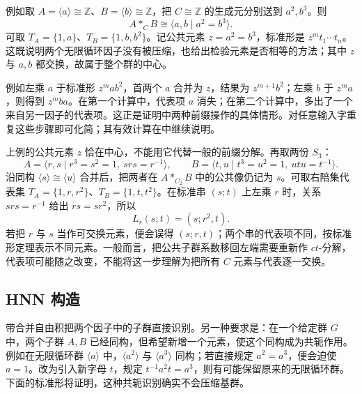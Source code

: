 例如取 \(A=\langle a\rangle\cong\mathbb Z\)、\(B=\langle b\rangle\cong\mathbb Z\)，把 \(C\cong\mathbb Z\) 的生成元分别送到 \(a^2,b^3\)。则
\[
	A*_C B\cong\langle a,b\mid a^2=b^3\rangle.
\]
可取 \(T_A=\{1,a\}\)、\(T_B=\{1,b,b^2\}\)。记公共元素 \(z=a^2=b^3\)，标准形是 \(z^m t_1\cdots t_n\)。这既说明两个无限循环因子没有被压缩，也给出检验元素是否相等的方法；其中 \(z\) 与 \(a,b\) 都交换，故属于整个群的中心。

\ProseParagraphBreak
例如左乘 \(a\) 于标准形 \(z^mab^2\)，首两个 \(a\) 合并为 \(z\)，结果为 \(z^{m+1}b^2\)；左乘 \(b\) 于 \(z^ma\)，则得到 \(z^mba\)。在第一个计算中，代表项 \(a\) 消失；在第二个计算中，多出了一个来自另一因子的代表项。这正是证明中两种前缀操作的具体情形。对任意输入字重复这些步骤即可化简；其有效计算在中继续说明。

\ProseParagraphBreak
上例的公共元素 \(z\) 恰在中心，不能用它代替一般的前缀分解。再取两份 \(S_3\)：
\[
	A=\langle r,s\mid r^3=s^2=1,\ srs=r^{-1}\rangle, \qquad B=\langle t,u\mid t^3=u^2=1,\ utu=t^{-1}\rangle.
\]
沿同构 \(\langle s\rangle\cong\langle u\rangle\) 合并后，把两者在 \(A*_{C_2}B\) 中的公共像仍记为 \(s\)。可取右陪集代表集 \(T_A=\{1,r,r^2\}\)、\(T_B=\{1,t,t^2\}\)。在标准串 \((s;t)\) 上左乘 \(r\) 时，关系 \(srs=r^{-1}\) 给出 \(rs=sr^2\)，所以
\[
	L_r(s;t)=(s;r^2,t).
\]
若把 \(r\) 与 \(s\) 当作可交换元素，便会误得 \((s;r,t)\)；两个串的代表项不同，按标准形定理表示不同元素。一般而言，把公共子群系数移回左端需要重新作 \(ct\)-分解，代表项可能随之改变，不能将这一步理解为把所有 \(C\) 元素与代表逐一交换。

\subsection{HNN 构造}
\label{b1:subsec:C01:04}

带合并自由积把两个因子中的子群直接识别。另一种要求是：在一个给定群 \(G\) 中，两个子群 \(A,B\) 已经同构，但希望新增一个元素，使这个同构成为共轭作用。例如在无限循环群 \(\langle a\rangle\) 中，\(\langle a^2\rangle\) 与 \(\langle a^3\rangle\) 同构；若直接规定 \(a^2=a^3\)，便会迫使 \(a=1\)。改为引入新字母 \(t\)，规定 \(t^{-1}a^2t=a^3\)，则有可能保留原来的无限循环群。下面的标准形将证明，这种共轭识别确实不会压缩基群。

